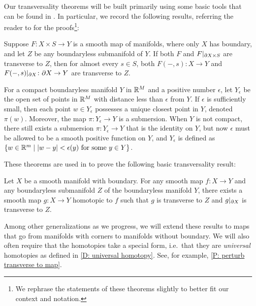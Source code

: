 Our transversality theorems will be built primarily using some basic tools that can be found in \cite[Section 2.3]{GuPo74}.
In particular, we record the following results, referring the reader to \cite[Section 2.3]{GuPo74} for the proofs\footnote{We rephrase the statements of these theorems slightly to better fit our context and notation.}:

\begin{theorem}\label{T: GP transversality}
	Suppose $F \colon X \times S \to Y$ is a smooth map of manifolds, where only $X$ has boundary, and let $Z$ be any boundaryless submanifold of $Y$.
	If both $F$ and $F|_{\partial X \times S}$ are transverse to $Z$, then for almost every $s \in S$, both $F(-,s) \colon X \to Y$ and $F(-,s)|_{\partial X} \colon \partial X \to Y$ are transverse to $Z$.
\end{theorem}

\begin{theorem}\label{T: epsilon neighborhood}
	For a compact boundaryless manifold $Y$ in $\mathbb{R}^M$ and a positive number $\epsilon$, let $Y_\epsilon$ be the open set of points in $\mathbb{R}^M$ with distance less than $\epsilon$ from $Y$.
	If $\epsilon$ is sufficiently small, then each point $w \in Y_\epsilon$ possesses a unique closest point in $Y$, denoted $\pi(w)$.
	Moreover, the map $\pi \colon Y_\epsilon \to Y$ is a submersion.
	When $Y$ is not compact, there still exists a submersion $\pi \colon Y_\epsilon \to Y$ that is the identity on $Y$, but now $\epsilon$ must be allowed to be a smooth positive function on $Y$, and $Y_\epsilon$ is defined as $\{w \in \mathbb{R}^m \mid |w-y|<\epsilon(y) \text{\ for some\ } y \in Y\}$.
\end{theorem}

These theorems are used in \cite{GuPo74} to prove the following basic transversality result:

\begin{theorem}
	Let $X$ be a smooth manifold with boundary.
	For any smooth map $f \colon X \to Y$ and any boundaryless submanifold $Z$ of the boundaryless manifold $Y$, there exists a smooth map $g \colon X \to Y$ homotopic to $f$ such that $g$ is transverse to $Z$ and $g|_{\partial X}$ is transverse to $Z$.
\end{theorem}

Among other generalizations as we progress, we will extend these results to maps that go from manifolds with corners to manifolds without boundary.
We will also often require that the homotopies take a special form, i.e.\ that they are \textit{universal} homotopies as defined in \cref{D: universal homotopy}.
See, for example, \cref{P: perturb transverse to map}.

